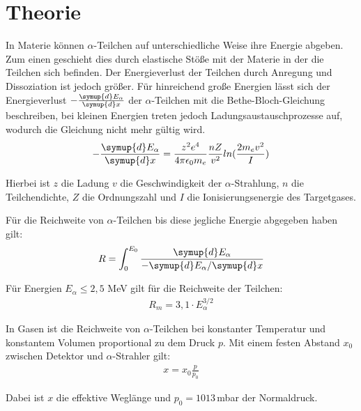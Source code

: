 \section{Theorie}
\label{sec:Theorie}

In Materie können $\alpha$-Teilchen auf unterschiedliche Weise ihre Energie abgeben. Zum einen geschieht dies durch elastische Stöße mit
der Materie in der die Teilchen sich befinden. Der Energieverlust der Teilchen durch Anregung und Dissoziation ist jedoch
größer. Für hinreichend große Energien lässt sich der Energieverlust $-\frac{\symup{d}E_{\alpha}}{\symup{d}x}$ der $\alpha$-Teilchen
mit die Bethe-Bloch-Gleichung beschreiben, bei kleinen Energien treten jedoch Ladungsaustauschprozesse auf, wodurch die Gleichung
nicht mehr gültig wird.
\begin{align}
  -\frac{\symup{d}E_{\alpha}}{\symup{d}x} = \frac{z^2 e^4}{4 \pi \epsilon_0 m_e} \frac{n Z}{v^2} ln(\frac{2 m_e v^2}{I})
\end{align}

Hierbei ist $z$ die Ladung $v$ die Geschwindigkeit der $\alpha$-Strahlung, $n$ die Teilchendichte, $Z$ die Ordnungszahl und $I$ die
Ionisierungsenergie des Targetgases.

Für die Reichweite von $\alpha$-Teilchen bis diese jegliche Energie abgegeben haben gilt:
\begin{align}
  R = \int_0^{E_0} \frac{\symup{d}E_{\alpha}}{-\symup{d}E_{\alpha} / \symup{d}x}
\end{align}

Für Energien $E_{\alpha} \leq 2,5$ MeV gilt für die Reichweite der Teilchen:
\begin{align}
  R_m = 3,1 \cdot E_{\alpha}^{3/2}
\end{align}

In Gasen ist die Reichweite von $\alpha$-Teilchen bei konstanter Temperatur und konstantem Volumen proportional zu dem Druck $p$.
Mit einem festen Abstand $x_0$ zwischen Detektor und $\alpha$-Strahler gilt:
\begin{align}
  x = x_0 \frac{p}{p_0}
\end{align}

Dabei ist $x$ die effektive Weglänge und $p_0 =1013$\,mbar der Normaldruck.
